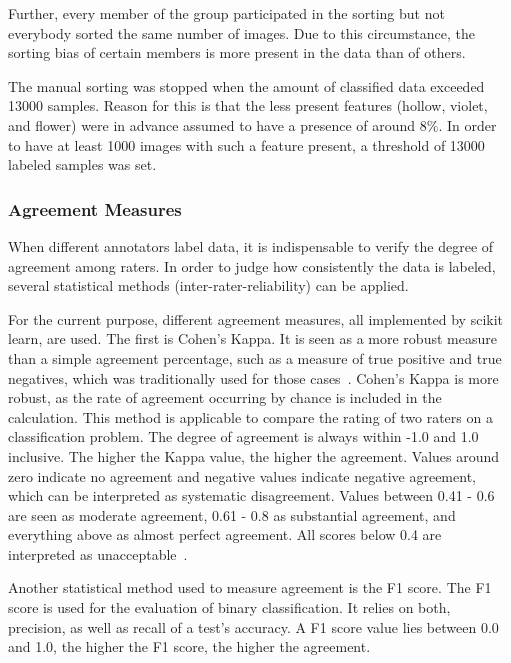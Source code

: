 Further, every member of the group participated in the sorting but not everybody sorted the same number of images. Due to this circumstance, the sorting bias of certain members is more present in the data than of others.

The manual sorting was stopped when the amount of classified data exceeded 13000 samples. Reason for this is that the less present features (hollow, violet, and flower) were in advance assumed to have a presence of around 8\%. In order to have at least 1000 images with such a feature present, a threshold of 13000 labeled samples was set.


\subsubsection{Agreement Measures}
\label{subsec:AgreementMeasures}

When different annotators label data, it is indispensable to verify the degree of agreement among raters. In order to judge how consistently the data is labeled, several statistical methods (inter-rater-reliability) can be applied.

\bigskip
For the current purpose, different agreement measures, all implemented by scikit learn, are used. The first is Cohen’s Kappa. It is seen as a more robust measure than a simple agreement percentage, such as a measure of true positive and true negatives, which was traditionally used for those cases~\citep{cohen1960coefficient}. Cohen’s Kappa is more robust, as the rate of agreement occurring by chance is included in the calculation. This method is applicable to compare the rating of two raters on a classification problem. The degree of agreement is always within -1.0 and 1.0 inclusive. The higher the Kappa value, the higher the agreement. Values around zero indicate no agreement and negative values indicate negative agreement, which can be interpreted as systematic disagreement. Values between 0.41 - 0.6 are seen as moderate agreement, 0.61 - 0.8 as substantial agreement, and everything above as almost perfect agreement. All scores below 0.4 are interpreted as unacceptable~\citep{mchugh2012interrater}. 

\bigskip
Another statistical method used to measure agreement is the F1 score. The F1 score is used for the evaluation of binary classification. It relies on both, precision, as well as recall of a test’s accuracy. A F1 score value lies between 0.0 and 1.0, the higher the F1 score, the higher the agreement.

